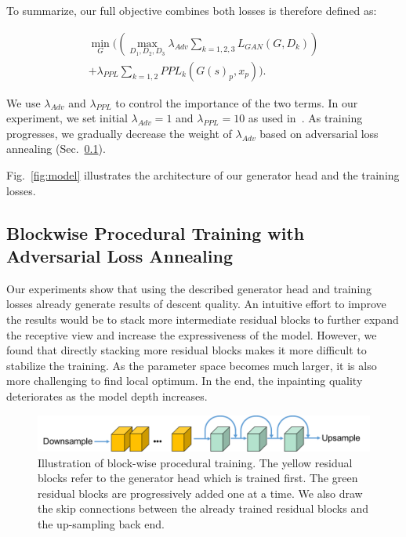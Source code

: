 To summarize, our full objective combines both losses is therefore defined as:

\begin{eqnarray}
\min\limits_G((\max\limits_{D_1, D_2, D_3}\lambda_{Adv}\sum\limits_{k=1,2,3} L_{GAN}(G,D_k)) \\ \nonumber
+\lambda_{PPL}\sum\limits_{k=1,2}PPL_k(G(s)_p, x_p)).
\end{eqnarray}

We use $\lambda_{Adv}$ and $\lambda_{PPL}$ to control the importance of the two terms. In our experiment, we set initial $\lambda_{Adv}=1$ and $\lambda_{PPL}=10$ as used in~\cite{pathak2016context,wang2017high}. As training progresses, we gradually decrease the weight of $\lambda_{Adv}$ based on adversarial loss annealing (Sec.~\ref{sec:procedural}).

Fig.~\ref{fig:model} illustrates the architecture of our generator head and the training losses.

\subsection{Blockwise Procedural Training with Adversarial Loss Annealing}
\label{sec:procedural}
Our experiments show that using the described generator head and training losses already generate results of descent quality. An intuitive effort to improve the results would be to stack more intermediate residual blocks to further expand the receptive view and increase the expressiveness of the model. However, we found that directly stacking more residual blocks makes it more difficult to stabilize the training. As the parameter space becomes much larger, it is also more challenging to find local optimum. In the end, the inpainting quality deteriorates as the model depth increases.

\begin{figure}[t]
\centering
\small
\includegraphics[width=.45\textwidth]{figures/proc.pdf}
\caption{Illustration of block-wise procedural training. The yellow residual blocks refer to the generator head which is trained first. The green residual blocks are progressively added one at a time. We also draw the skip connections between the already trained residual blocks and the up-sampling back end.}
\label{fig:procedural}

\end{figure}

